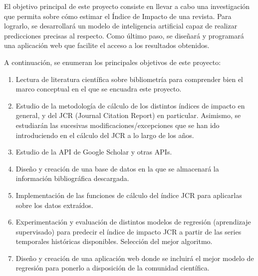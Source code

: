 
El objetivo principal de este proyecto consiste en llevar a cabo una investigación que permita sobre cómo estimar el Índice de Impacto de una revista. Para lograrlo, se desarrollará un modelo de inteligencia artificial capaz de realizar predicciones precisas al respecto. Como último paso, se diseñará y programará una aplicación web que facilite el acceso a los resultados obtenidos.

A continuación, se enumeran los principales objetivos de este proyecto:

\begin{enumerate}
\item Lectura de literatura científica sobre bibliometría para comprender bien el marco conceptual en el que se encuadra este proyecto.
\item Estudio de la metodología de cálculo de los distintos índices de impacto en general, y del JCR (Journal Citation Report) en particular. Asimismo, se estudiarán las sucesivas modificaciones/excepciones que se han ido introduciendo en el cálculo del JCR a lo largo de los años.
\item Estudio de la API de Google Scholar y otras APIs.
\item Diseño y creación de una base de datos en la que se almacenará la información bibliográfica descargada.
\item Implementación de las funciones de cálculo del índice JCR para aplicarlas sobre los datos extraídos. 
\item Experimentación y evaluación de distintos modelos de regresión (aprendizaje supervisado) para predecir el índice de impacto JCR a partir de las series temporales históricas disponibles. Selección del mejor algoritmo.
\item Diseño y creación de una aplicación web donde se incluirá el mejor modelo de regresión para ponerlo a disposición de la comunidad científica.
\end{enumerate}